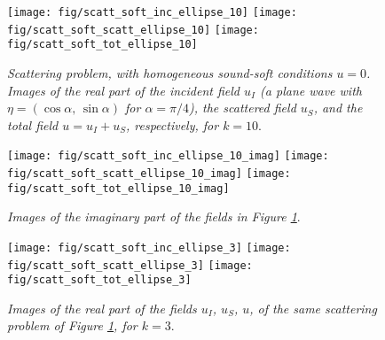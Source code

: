 \documentclass[10pt, a4paper]{article} %
\numberwithin{equation}{section}
\theoremstyle{definition}
\theoremstyle{plain}
\theoremstyle{plain}
\theoremstyle{plain}
\theoremstyle{plain}
\theoremstyle{plain}
\theoremstyle{plain}
\theoremstyle{plain}
\theoremstyle{plain}
\begin{document}
\begin{center}
\begin{figure}
{
\texttt{[image: fig/scatt\_soft\_inc\_ellipse\_10]}
}
{
\texttt{[image: fig/scatt\_soft\_scatt\_ellipse\_10]}
}
{
\texttt{[image: fig/scatt\_soft\_tot\_ellipse\_10]}
}
\caption{\emph{Scattering problem, with homogeneous sound-soft conditions $u=0$. Images of the 
real part
of the incident field $u_I$ (a plane wave with $\eta=(\cos\alpha,\, \sin\alpha)$ for $\alpha=\pi/4$), the scattered field 
$u_S$, and the total field $u=u_I + u_S$, respectively, for $k=10$}.}
\label{fig:scatt_soft_ellipse_10}
\end{figure}
\end{center}
\begin{center}
\begin{figure}
{
\texttt{[image: fig/scatt\_soft\_inc\_ellipse\_10\_imag]}
}
{
\texttt{[image: fig/scatt\_soft\_scatt\_ellipse\_10\_imag]}
}
{
\texttt{[image: fig/scatt\_soft\_tot\_ellipse\_10\_imag]}
}
\caption{\emph{Images of the imaginary part of the fields in 
Figure \ref{fig:scatt_soft_ellipse_10}}.}
\label{fig:scatt_soft_ellipse_10_imag}
\end{figure}
\end{center}

\begin{center}
\begin{figure}
{
\texttt{[image: fig/scatt\_soft\_inc\_ellipse\_3]}
}
{
\texttt{[image: fig/scatt\_soft\_scatt\_ellipse\_3]}
}
{
\texttt{[image: fig/scatt\_soft\_tot\_ellipse\_3]}
}
\caption{\emph{Images of the real part of the fields $u_I$, $u_S$, $u$, of the same scattering 
problem of Figure \ref{fig:scatt_soft_ellipse_10}, for $k=3$}.}
\label{fig:scatt_soft_ellipse_3}
\end{figure}
\end{center}
\clearpage
\end{document}
